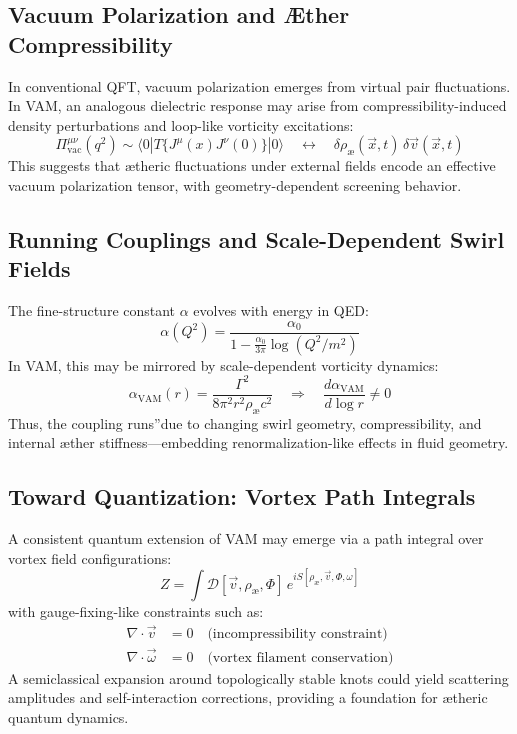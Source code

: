\subsection{Vacuum Polarization and Æther Compressibility}

In conventional QFT, vacuum polarization emerges from virtual pair fluctuations. In VAM, an analogous dielectric response may arise from compressibility-induced density perturbations and loop-like vorticity excitations:
\begin{equation}
    \Pi^{\mu\nu}_{\text{vac}}(q^2) \sim \langle 0 | T\{J^\mu(x) J^\nu(0)\} | 0 \rangle
    \quad \longleftrightarrow \quad
    \delta \rho_\text{\ae}(\vec{x}, t) \, \delta \vec{v}(\vec{x}, t)
\end{equation}
This suggests that ætheric fluctuations under external fields encode an effective vacuum polarization tensor, with geometry-dependent screening behavior.

\subsection{Running Couplings and Scale-Dependent Swirl Fields}

The fine-structure constant \( \alpha \) evolves with energy in QED:
\begin{equation}
    \alpha(Q^2) = \frac{\alpha_0}{1 - \frac{\alpha_0}{3\pi} \log(Q^2 / m^2)}
\end{equation}
In VAM, this may be mirrored by scale-dependent vorticity dynamics:
\begin{equation}
    \alpha_{\text{VAM}}(r) = \frac{\Gamma^2}{8\pi^2 r^2 \rho_\text{\ae} c^2}
    \quad \Rightarrow \quad
    \frac{d\alpha_{\text{VAM}}}{d \log r} \neq 0
\end{equation}
Thus, the coupling \grqq runs\textquotedblright due to changing swirl geometry, compressibility, and internal æther stiffness—embedding renormalization-like effects in fluid geometry.

\subsection{Toward Quantization: Vortex Path Integrals}

A consistent quantum extension of VAM may emerge via a path integral over vortex field configurations:
\begin{equation}
    Z = \int \mathcal{D}[\vec{v}, \rho_\text{\ae}, \Phi] \, e^{i S[\rho_\text{\ae}, \vec{v}, \Phi, \omega]}
\end{equation}
with gauge-fixing-like constraints such as:
\begin{align*}
    \nabla \cdot \vec{v} &= 0 \quad \text{(incompressibility constraint)} \\
    \nabla \cdot \vec{\omega} &= 0 \quad \text{(vortex filament conservation)}
\end{align*}
A semiclassical expansion around topologically stable knots could yield scattering amplitudes and self-interaction corrections, providing a foundation for ætheric quantum dynamics.

